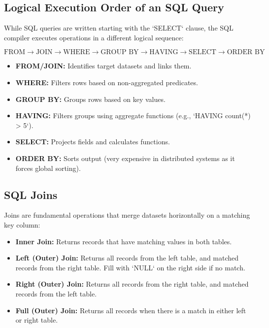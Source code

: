 \documentclass[12pt,a4paper]{article}
\begin{document}
\subsection{Logical Execution Order of an SQL Query}
While SQL queries are written starting with the `SELECT` clause, the SQL compiler executes operations in a different logical sequence:

\begin{tcolorbox}[formulabox, title={Logical SQL Execution Order}]
  $$\text{FROM} \longrightarrow \text{JOIN} \longrightarrow \text{WHERE} \longrightarrow \text{GROUP BY} \longrightarrow \text{HAVING} \longrightarrow \text{SELECT} \longrightarrow \text{ORDER BY}$$
  \begin{itemize}[leftmargin=*, noitemsep]
    \item \textbf{FROM/JOIN:} Identifies target datasets and links them.
    \item \textbf{WHERE:} Filters rows based on non-aggregated predicates.
    \item \textbf{GROUP BY:} Groups rows based on key values.
    \item \textbf{HAVING:} Filters groups using aggregate functions (e.g., `HAVING count(*) > 5`).
    \item \textbf{SELECT:} Projects fields and calculates functions.
    \item \textbf{ORDER BY:} Sorts output (very expensive in distributed systems as it forces global sorting).
  \end{itemize}
\end{tcolorbox}

\subsection{SQL Joins}
Joins are fundamental operations that merge datasets horizontally on a matching key column:
\begin{itemize}[leftmargin=*, itemsep=3pt]
  \item \textbf{Inner Join:} Returns records that have matching values in both tables.
  \item \textbf{Left (Outer) Join:} Returns all records from the left table, and matched records from the right table. Fill with `NULL` on the right side if no match.
  \item \textbf{Right (Outer) Join:} Returns all records from the right table, and matched records from the left table.
  \item \textbf{Full (Outer) Join:} Returns all records when there is a match in either left or right table.
\end{itemize}
\end{document}
